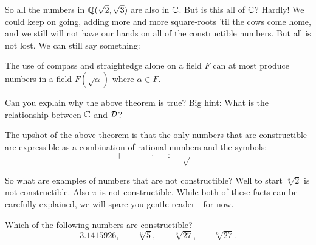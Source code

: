 So all the numbers in $\mathbb Q(\sqrt{2},\sqrt{3})$ are also in $\mathbb C$. But is
this all of $\mathbb C$? Hardly! We could keep on going, adding more and more
square-roots 'til the cows come home, and we still will not have our
hands on all of the constructible numbers. But all is not lost. We can
still say something:


\begin{theorem} 
The use of compass and straightedge alone on a field $F$ can at most
produce numbers in a field $F( \sqrt{\alpha} )$ where $\alpha \in F$.
\end{theorem}

\begin{question} Can you explain why the above theorem is true? Big hint: What is the relationship between $\mathbb C$ and $\mathcal D$?
\end{question}
\QM


The upshot of the above theorem is that the only numbers that are
constructible are expressible as a combination of rational numbers and
the symbols:
\[
+\quad -\quad \cdot\quad \div \quad \sqrt{\hspace{1em}}
\]

So what are examples of numbers that are not constructible? Well to
start $\sqrt[3]{2}$ is not constructible. Also $\pi$ is not
constructible. While both of these facts can be carefully explained,
we will spare you gentle reader---for now.


\begin{question} Which of the following numbers are constructible?
\[
3.1415926, \qquad \sqrt[16]{5}, \qquad \sqrt[3]{27}, \qquad \sqrt[6]{27}.
\]
\end{question}
\QM



